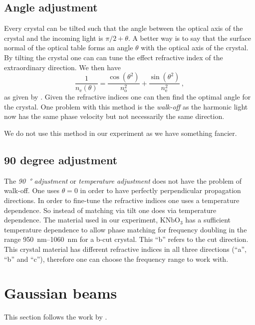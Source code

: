 \documentclass[11pt, english, fleqn, DIV=15, headinclude, BCOR=2cm]{scrreprt}
\begin{document}
\subsection{Angle adjustment}

Every crystal can be tilted such that the angle between the optical axis of the
crystal and the incoming light is $\pi/2 + \theta$. A better way is to say that
the surface normal of the optical table forms an angle $\theta$ with the
optical axis of the crystal. By tilting the crystal one can can tune the
effect refractive index of the extraordinary direction. We then have
\[
    \frac1{n_\mathrm e(\theta)}
    = \frac{\cos(\theta^2)}{n_\mathrm o^2}
    + \frac{\sin(\theta^2)}{n_\mathrm e^2} \,,
\]
as given by \textcite[Equation~(3.31)]{meschede/optik_licht_laser/2008}. Given
the refractive indices one can then find the optimal angle for the crystal. One
problem with this method is the \emph{walk-off} as the harmonic light now has
the same phase velocity but not necessarily the same direction.

We do not use this method in our experiment as we have something fancier.

\subsection{90 degree adjustment}

The \emph{\SI{90}{\degree} adjustment} or \emph{temperature adjustment} does
not have the problem of walk-off. One uses $\theta = 0$ in order to have
perfectly perpendicular propagation directions. In order to fine-tune the
refractive indices one uses a temperature dependence. So instead of matching
via tilt one does via temperature dependence. The material used in our
experiment, $\mathrm{KNbO_3}$ has a sufficient temperature dependence to allow
phase matching for frequency doubling in the range
\SIrange{950}{1060}{\nano\meter} for a b-cut crystal. This \enquote b refers to
the cut direction. This crystal material has different refractive indices in
all three directions (\enquote a, \enquote b and \enquote c), therefore one can
choose the frequency range to work with.

\section{Gaussian beams}

This section follows the work by
\textcite[Section~12.4.4]{meschede/optik_licht_laser/2008}.
\end{document}
